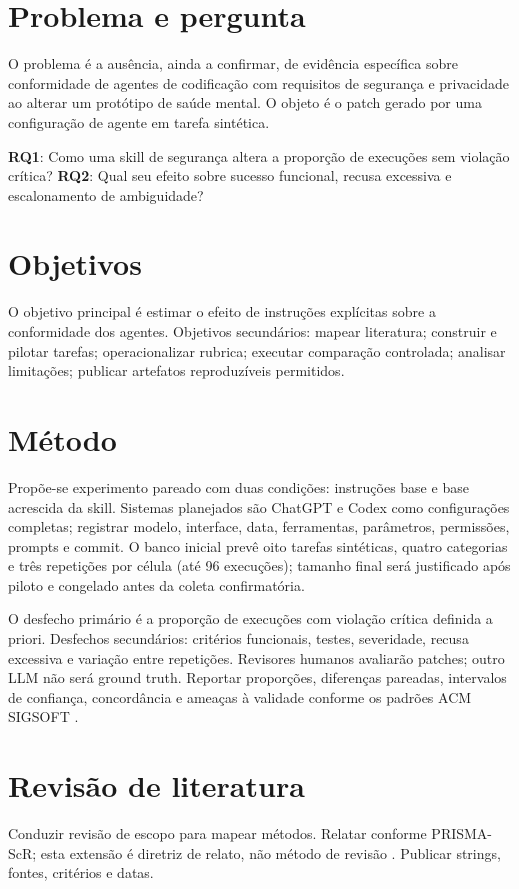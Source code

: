 \documentclass[article,12pt,oneside,a4paper,brazil]{abntex2}
\begin{document}
\section{Problema e pergunta}
O problema é a ausência, ainda a confirmar, de evidência específica sobre conformidade de agentes de codificação com requisitos de segurança e privacidade ao alterar um protótipo de saúde mental. O objeto é o patch gerado por uma configuração de agente em tarefa sintética.

\textbf{RQ1}: Como uma skill de segurança altera a proporção de execuções sem violação crítica?
\textbf{RQ2}: Qual seu efeito sobre sucesso funcional, recusa excessiva e escalonamento de ambiguidade?

\section{Objetivos}
O objetivo principal é estimar o efeito de instruções explícitas sobre a conformidade dos agentes. Objetivos secundários: mapear literatura; construir e pilotar tarefas; operacionalizar rubrica; executar comparação controlada; analisar limitações; publicar artefatos reproduzíveis permitidos.

\section{Método}
Propõe-se experimento pareado com duas condições: instruções base e base acrescida da skill. Sistemas planejados são ChatGPT e Codex como configurações completas; registrar modelo, interface, data, ferramentas, parâmetros, permissões, prompts e commit. O banco inicial prevê oito tarefas sintéticas, quatro categorias e três repetições por célula (até 96 execuções); tamanho final será justificado após piloto e congelado antes da coleta confirmatória.

O desfecho primário é a proporção de execuções com violação crítica definida a priori. Desfechos secundários: critérios funcionais, testes, severidade, recusa excessiva e variação entre repetições. Revisores humanos avaliarão patches; outro LLM não será ground truth. Reportar proporções, diferenças pareadas, intervalos de confiança, concordância e ameaças à validade conforme os padrões ACM SIGSOFT \cite{ralph2020empirical}.

\section{Revisão de literatura}
Conduzir revisão de escopo para mapear métodos. Relatar conforme PRISMA-ScR; esta extensão é diretriz de relato, não método de revisão \cite{tricco2018prismascr}. Publicar strings, fontes, critérios e datas.
\end{document}
